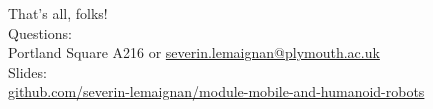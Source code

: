 \documentclass[compress]{beamer}
\begin{document}
\begin{frame}{}
    \begin{center}
        \Large
        That's all, folks!\\[2em]
        \normalsize
        Questions:\\
        Portland Square A216 or \url{severin.lemaignan@plymouth.ac.uk} \\[1em]

        Slides:\\ \href{https://github.com/severin-lemaignan/module-mobile-and-humanoid-robots}{\small github.com/severin-lemaignan/module-mobile-and-humanoid-robots}

    \end{center}
\end{frame}
\end{document}
